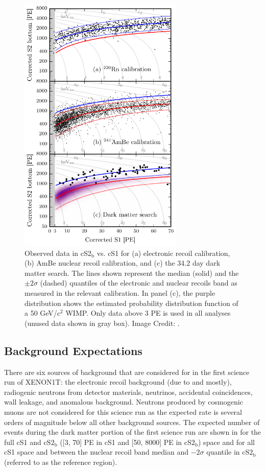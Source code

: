 \begin{figure}[p]
	\centering
	\includegraphics[width=0.7\textwidth]{xe1t_data_fsr}
	\caption{ Observed data in cS2$_\textrm{b}$ vs. cS1 for (a)  electronic recoil calibration, (b) AmBe nuclear recoil calibration, and (c) the 34.2 day dark matter search.  The lines shown represent the median (solid) and the $\pm 2 \sigma$ (dashed) quantiles of the electronic and nuclear recoils band as measured in the relevant calibration.  In panel (c), the purple distribution shows the estimated probability distribution function of a 50 GeV/$\textrm{c}^2$ WIMP.  Only data above 3 PE is  used in all analyses (unused data shown in gray box).  Image Credit: .}
	\label{fig:xe1t_data_fsr}
\end{figure}

\subsection{Background Expectations}

There are six sources of background that are considered for in the first science run of XENON1T: the electronic recoil background (due to \radon{} and \krypton{} mostly), radiogenic neutrons from detector materials, neutrinos, accidental coincidences, wall leakage, and anomalous background.  Neutrons produced by cosmogenic muons are not considered for this science run as the expected rate is several orders of magnitude below all other background sources.  The expected number of events during the dark matter portion of the first science run are shown in  for the full cS1 and $\textrm{cS2}_{\textrm{b}}$ ([3, 70] PE in cS1 and [50, 8000] PE in $\textrm{cS2}_{\textrm{b}}$) space and for all cS1 space and between the nuclear recoil band median and $-2\sigma$ quantile in $\textrm{cS2}_{\textrm{b}}$ (referred to as the reference region).

